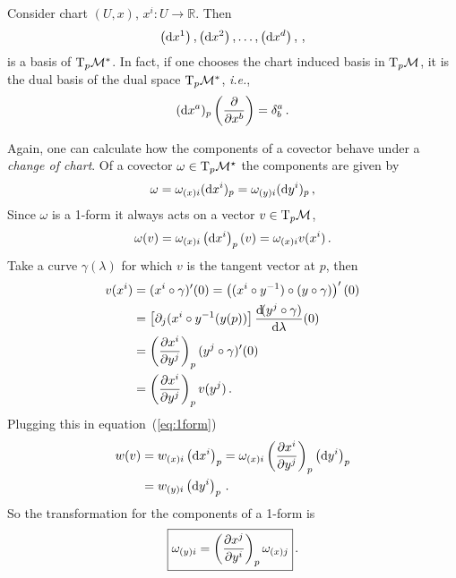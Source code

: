 \documentclass[11pt, a4paper, twocolumn]{article} %
\begin{document}
\begin{theorem}
    Consider chart $(U,x)$, $x^i: U \to \mathbb{R}$.
    Then
    \begin{equation}
        \left( \operatorname{d\!} x^1 \right), \left( \operatorname{d\!} x^2 \right), \ldots, \left( \operatorname{d\!} x^d \right),\,,
    \end{equation}
    is a basis of $\T_p\M^*$. In fact, if one chooses the chart induced basis in $\T_p\M$,
    it is the dual basis of the dual space $\T_p\M^*$, \textit{i.e.},
    \begin{equation}
        (\operatorname{d\!} x^a)_p \left( \frac{\partial}{\partial x^b} \right) = \delta^a_b\,.
    \end{equation}
\end{theorem}
Again, one can calculate how the components of a covector behave under a \textit{change of chart}.
Of a covector $\omega \in \T_p\M^\star$ the components are given by
\begin{equation}
    \omega = \omega_{(x)i}(\operatorname{d\!} x^i)_p = \omega_{(y)i}(\operatorname{d\!} y^i)_p\,,
    \label{eq:1form}
\end{equation}
Since $\omega$ is a 1-form it always acts on a vector $v\in \T_p\M$,
\begin{equation}
    \omega(v) = \omega_{(x)i}\left( \operatorname{d\!} x^i \right)_p(v) = \omega_{(x)i}v(x^i)\,.
\end{equation}
Take a curve $\gamma(\lambda)$ for which $v$ is the tangent vector at $p$, then
\begin{align*}
    v(x^i) &= (x^i\circ \gamma)'(0) = \left( (x^i \circ y^{-1} ) \circ ( y \circ \gamma ) \right)'(0) \\
    &= \left[ \partial_j(x^i \circ y^{-1} (y(p)) \right] \frac{\operatorname{d\!}( y^j \circ \gamma)}{\operatorname{d\!} \lambda}(0) \\
        &= \left( \frac{\partial x^i}{\partial y^j} \right)_p (y^j \circ \gamma)'(0)\\
        &= \left( \frac{\partial x^i}{\partial y^j} \right)_p v(y^j)\,.
\end{align*}
Plugging this in equation~(\ref{eq:1form})
\begin{align}
    w(v) &= w_{(x)i}\left( \operatorname{d\!} x^i \right)_p = \omega_{(x)i} \left( \frac{\partial x^i}{\partial y^j} \right)_p \left( \operatorname{d\!} y^i \right)_p\nonumber \\
    &= w_{(y)i}\left( \operatorname{d\!} y^i \right)_p\,.
\end{align}
So the transformation for the components of a 1-form is
\begin{equation}
    \boxed{%
        \omega_{(y)i} = \left( \frac{\partial x^j}{\partial y^i} \right)_p \omega_{(x)j}
}\,.
\end{equation}
\end{document}

